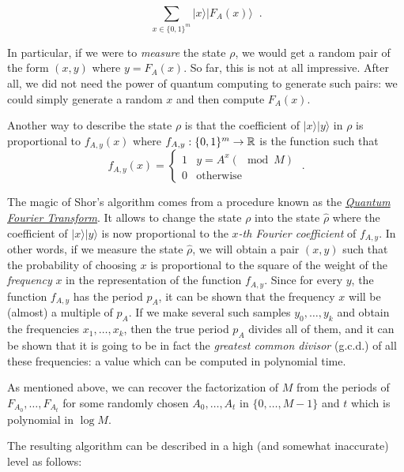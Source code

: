 \[
\sum_{x\in \{0,1\}^m} |x\rangle |F_A(x) \rangle \;\;.
\]

In particular, if we were to \emph{measure} the state \(\rho\), we would
get a random pair of the form \((x,y)\) where \(y= F_A(x)\). So far,
this is not at all impressive. After all, we did not need the power of
quantum computing to generate such pairs: we could simply generate a
random \(x\) and then compute \(F_A(x)\).

Another way to describe the state \(\rho\) is that the coefficient of
\(|x \rangle |y \rangle\) in \(\rho\) is proportional to \(f_{A,y}(x)\)
where \(f_{A,y} : \{0,1\}^m \rightarrow {\mathbb{R}}\) is the function such that
\[f_{A,y}(x) = \begin{cases} 1 & y = A^x (\mod M) \\ 0 & \text{otherwise} \end{cases} \;.\]

The magic of Shor's algorithm comes from a procedure known as the
\href{https://en.wikipedia.org/wiki/Quantum_Fourier_transform}{\emph{Quantum
Fourier Transform}}. It allows to change the state \(\rho\) into the
state \(\hat{\rho}\) where the coefficient of \(|x\rangle|y \rangle\) is
now proportional to the \emph{\(x\)-th Fourier coefficient} of
\(f_{A,y}\). In other words, if we measure the state \(\hat{\rho}\), we
will obtain a pair \((x,y)\) such that the probability of choosing \(x\)
is proportional to the square of the weight of the \emph{frequency}
\(x\) in the representation of the function \(f_{A,y}\). Since for every
\(y\), the function \(f_{A,y}\) has the period \(p_A\), it can be shown
that the frequency \(x\) will be (almost) a multiple of \(p_A\). If we
make several such samples \(y_0,\ldots,y_k\) and obtain the frequencies
\(x_1,\ldots,x_k\), then the true period \(p_A\) divides all of them,
and it can be shown that it is going to be in fact the \emph{greatest
common divisor} (g.c.d.) of all these frequencies: a value which can be
computed in polynomial time.

As mentioned above, we can recover the factorization of \(M\) from the
periods of \(F_{A_0},\ldots,F_{A_t}\) for some randomly chosen
\(A_0,\ldots,A_t\) in \(\{0,\ldots, M-1\}\) and \(t\) which is
polynomial in \(\log M\).

The resulting algorithm can be described in a high (and somewhat
inaccurate) level as follows:

